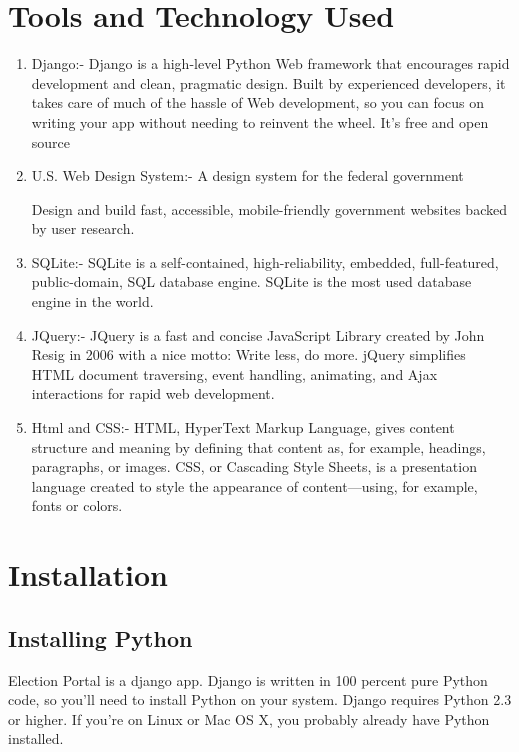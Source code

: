 \documentclass[12pt, a4paper, titlepage]{report}
\begin{document}
\section{Tools and Technology Used}

\begin{enumerate}
\item Django:- Django is a high-level Python Web framework that encourages rapid development and clean, pragmatic design. Built by experienced developers, it takes care of much of the hassle of Web development, so you can focus on writing your app without needing to reinvent the wheel. It’s free and open source

\item 
U.S. Web Design System:- 
A design system for the federal government

Design and build fast, accessible, mobile-friendly government websites backed by user research.


\item SQLite:- SQLite is a self-contained, high-reliability, embedded, full-featured, public-domain, SQL database engine. SQLite is the most used database engine in the world.

\item JQuery:- JQuery is a fast and concise JavaScript Library created by John Resig in 2006 with a nice motto: Write less, do more. jQuery simplifies HTML document traversing, event handling, animating, and Ajax interactions for rapid web development.

\item Html and CSS:- HTML, HyperText Markup Language, gives content structure and meaning by defining that content as, for example, headings, paragraphs, or images. CSS, or Cascading Style Sheets, is a presentation language created to style the appearance of content—using, for example, fonts or colors.
\end{enumerate}
\newpage
\section{Installation}
\subsection{Installing Python}

Election Portal is a django app. Django is written in 100 percent pure Python code, so you’ll need to install Python on your system. Django requires Python 2.3 or higher.
If you’re on Linux or Mac OS X, you probably already have Python installed.
\end{document}

